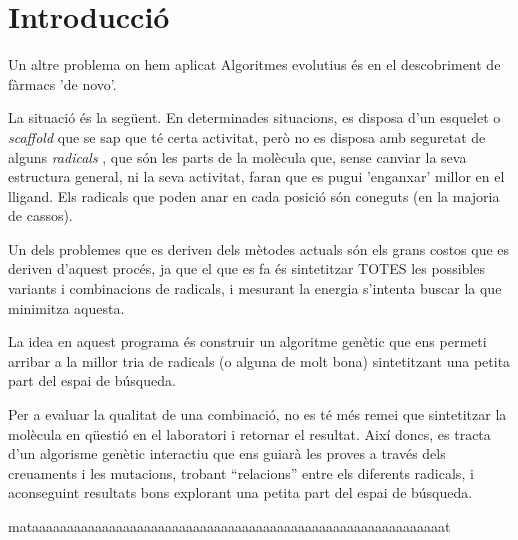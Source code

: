 \documentclass[titlepage,a4paper,12pt]{book}
\begin{document}
	\section{Introducció} %
	\label{sec:Introduccio}
	Un altre problema on hem aplicat Algoritmes evolutius és en el descobriment
	de fàrmacs 'de novo'.

	La situació és la següent.  En determinades situacions, es disposa d'un
	esquelet o \textit{scaffold} que se sap que té certa activitat, però no es
	disposa amb seguretat de alguns \textit{radicals} , que són les parts de la
	molècula que, sense canviar la seva estructura general, ni la seva
	activitat, faran que es pugui 'enganxar' millor en el lligand.  Els radicals
	que poden anar en cada posició són coneguts (en la majoria de cassos).

	Un dels problemes que es deriven dels mètodes actuals són els grans costos
	que es deriven d'aquest procés, ja que el que es fa és sintetitzar TOTES les
	possibles variants i combinacions de radicals, i mesurant la energia %
	s'intenta buscar la que minimitza aquesta.

	La idea en aquest programa és construir un algoritme genètic que ens permeti
	arribar a la millor tria de radicals (o alguna de molt bona) sintetitzant
	una petita part del espai de búsqueda.

	Per a evaluar la qualitat de una combinació, no es té més remei que
	sintetitzar la molècula en qüestió en el laboratori i retornar el resultat.
	Així doncs, es tracta d'un algorisme genètic interactiu %
	que ens guiarà les proves a través dels creuaments i les mutacions, trobant
	``relacions'' entre els diferents radicals, i aconseguint resultats bons
	explorant una petita part del espai de búsqueda.

	mataaaaaaaaaaaaaaaaaaaaaaaaaaaaaaaaaaaaaaaaaaaaaaaaaaaaaaaaaaat

	
	
\end{document}
